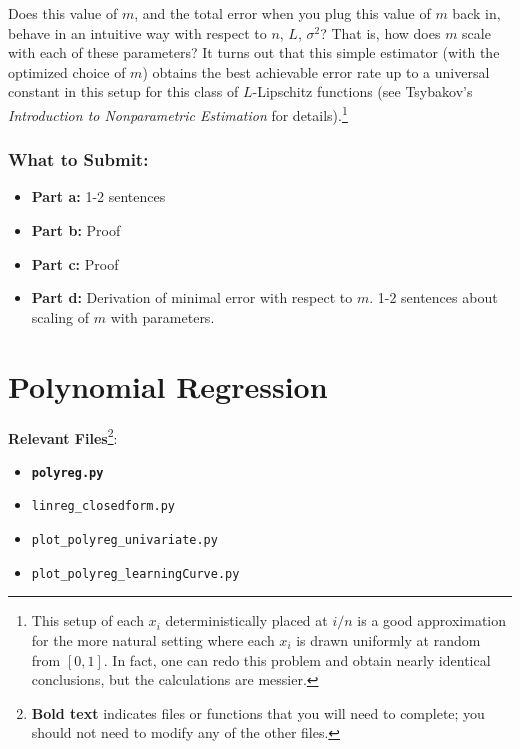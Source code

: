 \documentclass{article}
\begin{document}
\begin{bprob}
\begin{enumerate}
        \break
        Does this value of $m$, and the total error when you plug this value of $m$ back in, behave in an intuitive way with respect to $n$, $L$, $\sigma^2$?  That is, how does $m$ scale with each of these parameters? It turns out that this simple estimator (with the optimized choice of $m$) obtains the best achievable error rate up to a universal constant in this setup for this class of $L$-Lipschitz functions (see Tsybakov's \emph{Introduction to Nonparametric Estimation} for details){.}\footnote{This setup of each $x_i$ deterministically placed at $i/n$ is a good approximation for the more natural setting where each $x_i$ is drawn uniformly at random from $[0,1]$.  In fact, one can redo this problem and obtain nearly identical conclusions, but the calculations are messier.}
    \end{enumerate}
    
    \subsubsection*{What to Submit:}
    \begin{itemize}
        \item \textbf{Part a:} 1-2 sentences
        \item \textbf{Part b:} Proof
        \item \textbf{Part c:} Proof
        \item \textbf{Part d:} Derivation of minimal error with respect to $m$. 1-2 sentences about scaling of $m$ with parameters.
    \end{itemize}
\end{bprob}

\newpage

\section*{Polynomial Regression}
{\bf Relevant Files}\footnote{{\bf Bold text} indicates files or functions that you will need to complete; you should not need to modify any of the other files.}:
\vspace{-1.2em}
\begin{multicols}{2}
    \begin{itemize}[noitemsep,nolistsep]
        \item \texttt{\bf polyreg.py}
        \item \texttt{linreg\_closedform.py}
        \item \texttt{plot\_polyreg\_univariate.py}
        \item \texttt{plot\_polyreg\_learningCurve.py}
    \end{itemize}
\end{multicols}
\end{document}
